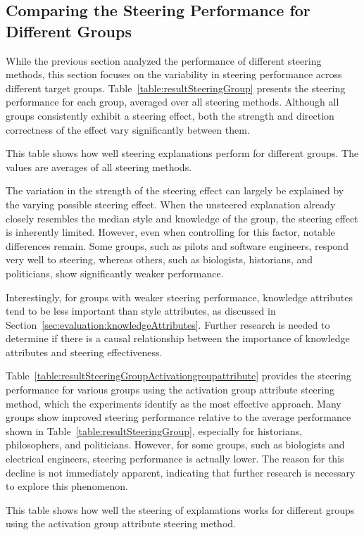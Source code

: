 \subsection{Comparing the Steering Performance for Different Groups}%
\label{sec:evaluation:steering:groups}

While the previous section analyzed the performance of different steering methods, this section focuses on the variability in steering performance across different target groups. Table~\ref{table:resultSteeringGroup} presents the steering performance for each group, averaged over all steering methods. Although all groups consistently exhibit a steering effect, both the strength and direction correctness of the effect vary significantly between them.

\begin{table}[ht]
  \caption[]{This table shows how well steering explanations perform for different groups. The values are averages of all steering methods.}%
  \label{table:resultSteeringGroup}
  \centering
  \resultSteeringGroup{}%
\end{table}

The variation in the strength of the steering effect can largely be explained by the varying possible steering effect. When the unsteered explanation already closely resembles the median style and knowledge of the group, the steering effect is inherently limited. However, even when controlling for this factor, notable differences remain. Some groups, such as pilots and software engineers, respond very well to steering, whereas others, such as biologists, historians, and politicians, show significantly weaker performance.

Interestingly, for groups with weaker steering performance, knowledge attributes tend to be less important than style attributes, as discussed in Section~\ref{sec:evaluation:knowledgeAttributes}. Further research is needed to determine if there is a causal relationship between the importance of knowledge attributes and steering effectiveness.

Table~\ref{table:resultSteeringGroupActivationgroupattribute} provides the steering performance for various groups using the activation group attribute steering method, which the experiments identify as the most effective approach. Many groups show improved steering performance relative to the average performance shown in Table~\ref{table:resultSteeringGroup}, especially for historians, philosophers, and politicians. However, for some groups, such as biologists and electrical engineers, steering performance is actually lower. The reason for this decline is not immediately apparent, indicating that further research is necessary to explore this phenomenon.

\begin{table}[ht]
  \caption[]{This table shows how well the steering of explanations works for different groups using the activation group attribute steering method.}%
  \label{table:resultSteeringGroupActivationgroupattribute}
  \centering
  \resultSteeringGroupActivationgroupattribute{}%
\end{table}
